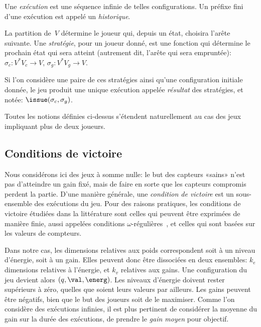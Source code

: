 Une \emph{exécution} est une séquence infinie de telles configurations.
Un préfixe fini d'une exécution est appelé un \emph{historique}.

La partition de~$V$ détermine le joueur qui, depuis un état, choisira l'arête suivante.
Une \emph{stratégie}, pour un joueur donné, est une fonction qui détermine le prochain état qui sera atteint (autrement dit, l'arête qui sera empruntée): $\sigma_c: V^* V_c \rightarrow V$, $\sigma_g: V^* V_g \rightarrow V$.

Si l'on considère une paire de ces stratégies ainsi qu'une configuration initiale donnée, le jeu produit une unique exécution appelée \emph{résultat} des stratégies, et notée: $\issue(\sigma_c,\sigma_g)$.

\begin{remark}
Toutes les notions définies ci-dessus s'étendent naturellement au cas des jeux impliquant plus de deux joueurs.
\end{remark}

\subsection{Conditions de victoire}

Nous considérons ici des jeux à somme nulle: le but des capteurs «sains» n'est pas d'atteindre un gain fixé, mais de faire en sorte que les capteurs compromis perdent la partie.
D'une manière générale, une \emph{condition de victoire} est un sous-ensemble des exécutions du jeu.
Pour des raisons pratiques, les conditions de victoire étudiées dans la littérature sont celles qui peuvent être exprimées de manière finie, aussi appelées conditions $\omega$-régulières~\cite{GTW02}, et celles qui sont basées sur les valeurs de compteurs.

Dans notre cas, les dimensions relatives aux poids correspondent soit à un niveau d'énergie, soit à un gain.
Elles peuvent donc être dissociées en deux ensembles: $k_e$ dimensions relatives à l'énergie, et $k_v$ relatives aux gains.
Une configuration du jeu devient alors $(q,\val,\energ)$.
Les niveaux d'énergie doivent rester supérieurs à zéro, quelles que soient leurs valeurs par ailleurs.
Les gains peuvent être négatifs, bien que le but des joueurs soit de le maximiser.
Comme l'on considère des exécutions infinies, il est plus pertinent de considérer la moyenne du gain sur la durée des exécutions, \cad de prendre le \emph{gain moyen} pour objectif.

